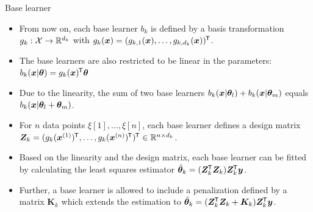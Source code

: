 \documentclass[t,10pt]{beamer}
\begin{document}
\begin{frame}{Base learner}
  \begin{itemize}
    \item
      From now on, each base learner $b_k$ is defined by a basis transformation $g_k : \Xspace \to \R^{d_k}$ with $g_k(\xv) = (g_{k,1}(\xv), \dots, g_{k,d_k}(\xv))^\tran$.

    \item
      The base learners are also restricted to be linear in the parameters: $b_k(\xv | \tb) = g_k(\xv)^\tran \tb$

    \item
      Due to the linearity, the sum of two base learners $b_k(\xv | \tb_l) + b_k(\xv | \tb_m)$ equals $b_k(\xv | \tb_l + \tb_m)$.

    \item
      For $n$ data points $\xi[1], \dots, \xi[n]$, each base learner defines a design matrix $\design_k = (g_k(\xi[1])^\tran, \dots, g_k(\xi[n])^\tran)^\tran\in\R^{n\times d_k}$.

    \item
      Based on the linearity and the design matrix, each base learner can be fitted by calculating the least squares estimator $\tbh_k = (\design_\blk^\tran \design_\blk) \design_k^\tran \yv$.

    \item
      Further, a base learner is allowed to include a penalization defined by a matrix $\bm{K}_k$ which extends the estimation to $\tbh_k = (\design_\blk^\tran \design_\blk + \bm{K}_k) \design_k^\tran \yv$.

  \end{itemize}
\end{frame}
\end{document}
